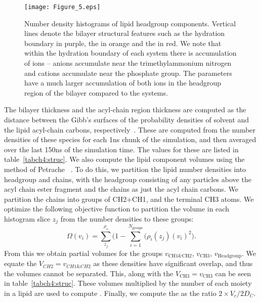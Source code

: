 \begin{figure}[H]
    \texttt{[image: Figure\_5.eps]}
    \caption[Number densities]{Number density histograms of lipid headgroup components. Vertical lines denote the bilayer structural features such as the hydration boundary in purple, the \dhh{} in orange and the \dc{} in red. We note
    that within the hydration boundary of each system there is accumulation of ions -- anions accumulate near the trimethylammonium nitrogen and cations accumulate near the phosphate group. The  parameters
have a much larger accumulation of both ions in the headgroup region of the bilayer compared to the  systems.}
    \label{figch4:soldens}
\end{figure}

The bilayer thickness \db{} and the acyl-chain region thickness \dc{} are computed as the distance between the Gibb's surfaces of the probability densities of solvent and the lipid acyl-chain carbons, respectively~\cite{fogarty:2015}. 
These are computed from the number densities of these species for each 1ns chunk of the simulation, and then averaged over the last 150ns of the simulation time.
The values for these are listed in table~\ref{tabch4:struc}. 
We also compute the lipid component volumes using the method of Petrache \etal{}~\cite{petrache:1997}. To do this, we partition the lipid number densities into 
headgroup and chains, with the headgroup consisting of any particles above the acyl chain ester fragment and the chains as just the acyl chain carbons. We partition the
chains into groups of CH2+CH1, and the terminal CH3 atoms. We optimize the following objective function to partition the volume in each histogram slice $z_j$ from the number densities to these groups:
\begin{equation}
    \Omega{(v_i)}=\sum^{\rho_s}_{z_j}\bigg(1-\sum^{N_{\text{groups}}}_{i=1}\big(\rho_i(z_j)(v_i)^2\bigg)\text{.}
\end{equation}
From this we obtain partial volumes for the groups $v_{\text{CH1\&CH2}}$, $v_{\text{CH3}}$, $v_{\text{Headgroup}}$. We equate the $V_{CH2}=v_{CH1\&CH2}$ as these densities have significant overlap, 
and thus the volumes cannot be separated. This, along with the $V_{\text{CH3}}=v_{\text{CH3}}$ can be seen in table~\ref{tabch4:struc}. These volumes multiplied by the number of each 
moiety in a lipid are used to compute \Vc. Finally, we compute the \al as the ratio $2\times{}V_c/2D_C$.

